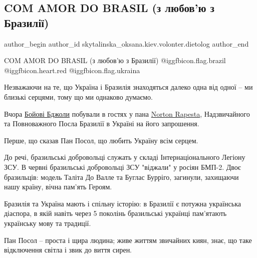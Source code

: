  
 
 
 
 
 
\subsection{COM AMOR DO BRASIL (з любов'ю з Бразилії)}
\label{sec:16_11_2022.fb.skytalinska_oksana.kiev.volonter.dietolog.1.com_amor_do_brasil}
 
\ifcmt
 author_begin
   author_id skytalinska_oksana.kiev.volonter.dietolog
 author_end
\fi

COM AMOR DO BRASIL (з любов'ю з Бразилії)
@igg{fbicon.flag.brazil} @igg{fbicon.heart.red} @igg{fbicon.flag.ukraina}

Незважаючи на те, що Україна і Бразилія знаходяться далеко одна від одної -- ми
близькі серцями, тому що ми однаково думаємо.

Вчора \href{https://www.facebook.com/beeukrainian}{Бойові Бджоли} побували в гостях у пана \href{https://www.facebook.com/norton.rapesta}{Norton Rapesta}, Надзвичайного та
Повноважного Посла Бразилії в Україні на його запрошення.

Перше, що сказав Пан Посол, що любить Україну всім серцем.

До речі, бразильські добровольці служать у складі Інтернаціонального Легіону
ЗСУ. В червні бразильські добровольці ЗСУ "віджали" у росіян БМП-2. Двоє
бразильців: модель Таліта До Валле та Буглас Бурріго, загинули, захищаючи нашу
країну, вічна пам'ять Героям.

Бразилія та Україна мають і спільну історію: в Бразилії є потужна українська
діаспора, в якій навіть через 5 поколінь бразильські українці пам'ятають
українську мову та традиції.

Пан Посол -- проста і щира людина; живе життям звичайних киян, знає, що таке
відключення світла і звик до виття сирен.

